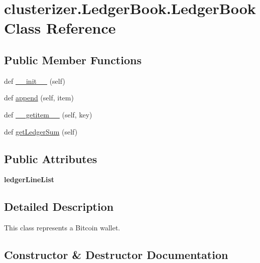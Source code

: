 \hypertarget{classclusterizer_1_1LedgerBook_1_1LedgerBook}{}\section{clusterizer.\+Ledger\+Book.\+Ledger\+Book Class Reference}
\label{classclusterizer_1_1LedgerBook_1_1LedgerBook}
\subsection*{Public Member Functions}
\begin{DoxyCompactItemize}
\item 
def \hyperlink{classclusterizer_1_1LedgerBook_1_1LedgerBook_ab414a1f4e257c062cc2e775bb148dbd4}{\+\_\+\+\_\+init\+\_\+\+\_\+} (self)
\item 
def \hyperlink{classclusterizer_1_1LedgerBook_1_1LedgerBook_a2e21e1b7e054692c0df9eeb1f5260f72}{append} (self, item)
\item 
def \hyperlink{classclusterizer_1_1LedgerBook_1_1LedgerBook_a489e3487717063bebc09d797c776536d}{\+\_\+\+\_\+getitem\+\_\+\+\_\+} (self, key)
\item 
def \hyperlink{classclusterizer_1_1LedgerBook_1_1LedgerBook_ae35a5f84cc4f09de31beb2485c030dbf}{get\+Ledger\+Sum} (self)
\end{DoxyCompactItemize}
\subsection*{Public Attributes}
\begin{DoxyCompactItemize}
\item 
\hypertarget{classclusterizer_1_1LedgerBook_1_1LedgerBook_ad221135120cd96b1d13ffee04f347723}{}{\bfseries ledger\+Line\+List}\label{classclusterizer_1_1LedgerBook_1_1LedgerBook_ad221135120cd96b1d13ffee04f347723}

\end{DoxyCompactItemize}


\subsection{Detailed Description}
\begin{DoxyVerb}This class represents a Bitcoin wallet.\end{DoxyVerb}
 

\subsection{Constructor \& Destructor Documentation}
\hypertarget{classclusterizer_1_1LedgerBook_1_1LedgerBook_ab414a1f4e257c062cc2e775bb148dbd4}{}
